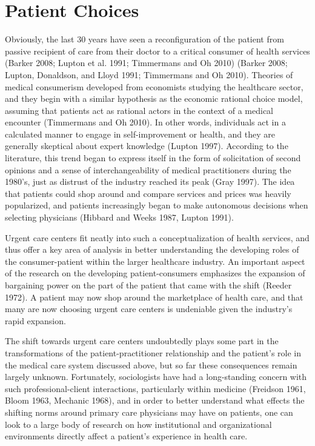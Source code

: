 \documentclass[12pt,twoside]{reedthesis}
\begin{document}
  \section*{Patient Choices}\label{patient-choices}
  
  Obviously, the last 30 years have seen a reconfiguration of the patient
  from passive recipient of care from their doctor to a critical consumer
  of health services (Barker 2008; Lupton et al. 1991; Timmermans and Oh
  2010) (Barker 2008; Lupton, Donaldson, and Lloyd 1991; Timmermans and Oh
  2010). Theories of medical consumerism developed from economists
  studying the healthcare sector, and they begin with a similar hypothesis
  as the economic rational choice model, assuming that patients act as
  rational actors in the context of a medical encounter (Timmermans and Oh
  2010). In other words, individuals act in a calculated manner to engage
  in self-improvement or health, and they are generally skeptical about
  expert knowledge (Lupton 1997). According to the literature, this trend
  began to express itself in the form of solicitation of second opinions
  and a sense of interchangeability of medical practitioners during the
  1980's, just as distrust of the industry reached its peak (Gray 1997).
  The idea that patients could shop around and compare services and prices
  was heavily popularized, and patients increasingly began to make
  autonomous decisions when selecting physicians (Hibbard and Weeks 1987,
  Lupton 1991).
  
  Urgent care centers fit neatly into such a conceptualization of health
  services, and thus offer a key area of analysis in better understanding
  the developing roles of the consumer-patient within the larger
  healthcare industry. An important aspect of the research on the
  developing patient-consumers emphasizes the expansion of bargaining
  power on the part of the patient that came with the shift (Reeder 1972).
  A patient may now shop around the marketplace of health care, and that
  many are now choosing urgent care centers is undeniable given the
  industry's rapid expansion.
  
  The shift towards urgent care centers undoubtedly plays some part in the
  transformations of the patient-practitioner relationship and the
  patient's role in the medical care system discussed above, but so far
  these consequences remain largely unknown. Fortunately, sociologists
  have had a long-standing concern with such professional-client
  interactions, particularly within medicine (Freidson 1961, Bloom 1963,
  Mechanic 1968), and in order to better understand what effects the
  shifting norms around primary care physicians may have on patients, one
  can look to a large body of research on how institutional and
  organizational environments directly affect a patient's experience in
  health care.
  
\end{document}
